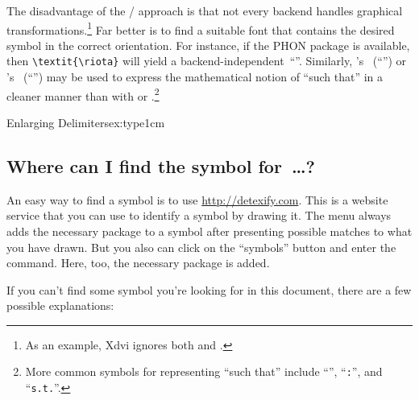   The disadvantage
  of the / approach is that not
  every \tex backend handles graphical transformations.\footnote{As an
  example, Xdvi ignores both  and
  \cmd{\rotatebox}.}  Far better is to find a suitable font that
  contains the desired symbol in the correct orientation.  For
  instance, if the PHON package is available, then
  \verb|\textit{\riota}| will yield a
  backend-independent~``\textit{\cmd{\riota}}''.
  Similarly,\label{page:such-that} \TIPA's
  \cmdI{\textrevepsilon}~(``\textrevepsilon'') or \WIPA's
  \cmdI{\textrevepsilon}~(``\textrevepsilon'') may be used to express the
  mathematical notion of ``such that'' in a cleaner
  manner than with  or
  \cmd{\rotatebox}.\footnote{More common symbols for representing
  ``such that'' include ``\texttt{\textbar}'',
  ``\texttt{:}'', and ``\texttt{s.t.}''.}



\begin{texexample}{Enlarging Delimiters}{ex:type1cm}
\newcommand{\makeBIG}[1]{\fontsize{1cm}{1cm}\selectfont\ensuremath{#1}}
  \makeBIG\>

\end{texexample}

\subsection{Where can I find the symbol for~\dots?}

\label{combining-symbols}

An easy way to find a symbol is to use \url{http://detexify.com}. This is a website service that you can use to identify a symbol by drawing it. The menu always adds the necessary package to a symbol after presenting possible matches to what you have drawn. But you also can click on the ``symbols'' button and enter the command. Here, too, the necessary package is added. 

If you can't find some symbol you're looking for in this document, there
are a few possible explanations:

